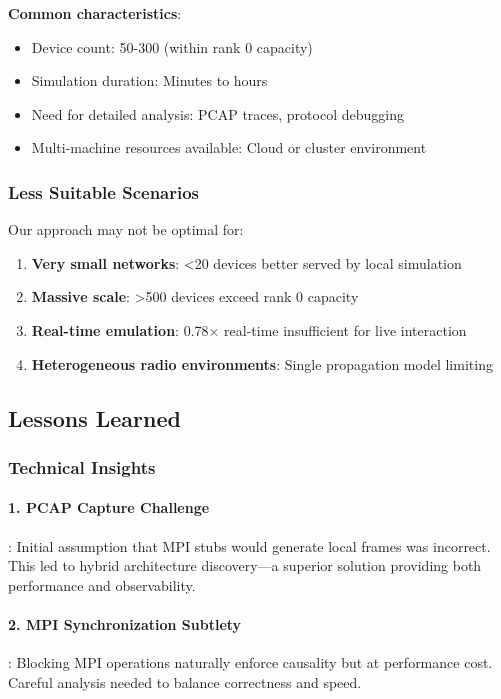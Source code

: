 \textbf{Common characteristics}:
\begin{itemize}
    \item Device count: 50-300 (within rank 0 capacity)
    \item Simulation duration: Minutes to hours
    \item Need for detailed analysis: PCAP traces, protocol debugging
    \item Multi-machine resources available: Cloud or cluster environment
\end{itemize}

\subsubsection{Less Suitable Scenarios}

Our approach may not be optimal for:

\begin{enumerate}
    \item \textbf{Very small networks}: <20 devices better served by local simulation
    \item \textbf{Massive scale}: >500 devices exceed rank 0 capacity
    \item \textbf{Real-time emulation}: 0.78× real-time insufficient for live interaction
    \item \textbf{Heterogeneous radio environments}: Single propagation model limiting
\end{enumerate}

\subsection{Lessons Learned}

\subsubsection{Technical Insights}

\paragraph{1. PCAP Capture Challenge}:
Initial assumption that MPI stubs would generate local frames was incorrect. This led to hybrid architecture discovery—a superior solution providing both performance and observability.

\paragraph{2. MPI Synchronization Subtlety}:
Blocking MPI operations naturally enforce causality but at performance cost. Careful analysis needed to balance correctness and speed.

